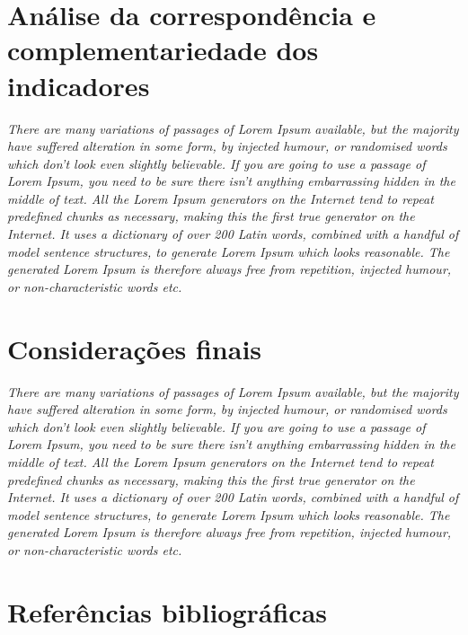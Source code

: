 \documentclass[
  letterpaper,
]{scrbook}
\begin{document}

\chapter{Análise da correspondência e complementariedade dos
indicadores}\label{anuxe1lise-da-corresponduxeancia-e-complementariedade-dos-indicadores}

\emph{There are many variations of passages of Lorem Ipsum available,
but the majority have suffered alteration in some form, by injected
humour, or randomised words which don't look even slightly believable.
If you are going to use a passage of Lorem Ipsum, you need to be sure
there isn't anything embarrassing hidden in the middle of text. All the
Lorem Ipsum generators on the Internet tend to repeat predefined chunks
as necessary, making this the first true generator on the Internet. It
uses a dictionary of over 200 Latin words, combined with a handful of
model sentence structures, to generate Lorem Ipsum which looks
reasonable. The generated Lorem Ipsum is therefore always free from
repetition, injected humour, or non-characteristic words etc.}


\chapter{Considerações finais}\label{cap7}

\emph{There are many variations of passages of Lorem Ipsum available,
but the majority have suffered alteration in some form, by injected
humour, or randomised words which don't look even slightly believable.
If you are going to use a passage of Lorem Ipsum, you need to be sure
there isn't anything embarrassing hidden in the middle of text. All the
Lorem Ipsum generators on the Internet tend to repeat predefined chunks
as necessary, making this the first true generator on the Internet. It
uses a dictionary of over 200 Latin words, combined with a handful of
model sentence structures, to generate Lorem Ipsum which looks
reasonable. The generated Lorem Ipsum is therefore always free from
repetition, injected humour, or non-characteristic words etc.}


\chapter*{Referências bibliográficas}\label{referencias}
\end{document}
